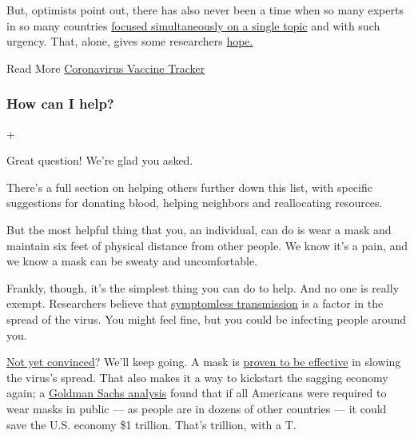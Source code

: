 But, optimists point out, there has also never been a time when so many
experts in so many countries
\href{https://www.nytimes3xbfgragh.onion/2020/04/01/world/europe/coronavirus-science-research-cooperation.html}{focused
simultaneously on a single topic} and with such urgency. That, alone,
gives some researchers
\href{https://www.nytimes3xbfgragh.onion/2020/05/20/health/coronavirus-vaccines.html}{hope.}

Read More
\href{https://www.nytimes3xbfgragh.onion/interactive/2020/science/coronavirus-vaccine-tracker.html}{Coronavirus
Vaccine Tracker}

\hypertarget{how-can-i-help}{%
\subsubsection{How can I help?}\label{how-can-i-help}}

+

Great question! We're glad you asked.

There's a full section on helping others further down this list, with
specific suggestions for donating blood, helping neighbors and
reallocating resources.

But the most helpful thing that you, an individual, can do is wear a
mask and maintain six feet of physical distance from other people. We
know it's a pain, and we know a mask can be sweaty and uncomfortable.

Frankly, though, it's the simplest thing you can do to help. And no one
is really exempt. Researchers believe that
\href{https://www.nytimes3xbfgragh.onion/2020/06/27/world/europe/coronavirus-spread-asymptomatic.html}{symptomless
transmission} is a factor in the spread of the virus. You might feel
fine, but you could be infecting people around you.

\href{https://www.nytimes3xbfgragh.onion/2020/06/02/health/coronavirus-face-masks-surveys.html}{Not
yet convinced}? We'll keep going. A mask is
\href{https://www.cdc.gov/coronavirus/2019-ncov/prevent-getting-sick/cloth-face-cover-guidance.html}{proven
to be effective} in slowing the virus's spread. That also makes it a way
to kickstart the sagging economy again; a
\href{https://www.forbes.com/sites/sarahhansen/2020/06/30/a-national-mask-mandate-could-save-the-us-economy-1-trillion-goldman-sachs-says/\#1083f1e56f18}{Goldman
Sachs analysis} found that if all Americans were required to wear masks
in public --- as people are in dozens of other countries --- it could
save the U.S. economy \$1 trillion. That's trillion, with a T.

